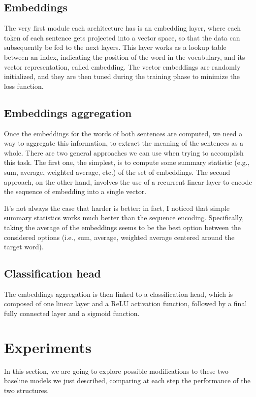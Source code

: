 \documentclass[11pt,a4paper]{article}
\begin{document}
	
	\subsection{Embeddings}
	The very first module each architecture has is an embedding layer, where each token of each sentence gets projected into a vector space, so that the data can subsequently be fed to the next layers. This layer works as a lookup table between an index, indicating the position of the word in the vocabulary, and its vector representation, called embedding. The vector embeddings are randomly initialized, and they are then tuned during the training phase to minimize the loss function.
	
	\subsection{Embeddings aggregation}
	Once the embeddings for the words of both sentences are computed, we need a way to aggregate this information, to extract the meaning of the sentences as a whole. There are two general approaches we can use when trying to accomplish this task. The first one, the simplest, is to compute some summary statistic (e.g., sum, average, weighted average, etc.) of the set of embeddings. The second approach, on the other hand, involves the use of a recurrent linear layer to encode the sequence of embedding into a single vector.
	
	It's not always the case that harder is better: in fact, I noticed that simple summary statistics works much better than the sequence encoding. Specifically, taking the average of the embeddings seems to be the best option between the considered options (i.e., sum, average, weighted average centered around the target word).
	
	\subsection{Classification head}
	The embeddings aggregation is then linked to a classification head, which is composed of one linear layer and a ReLU activation function, followed by a final fully connected layer and a sigmoid function.

	\section{Experiments}
	In this section, we are going to explore possible modifications to these two baseline models we just described, comparing at each step the performance of the two structures.
	
\end{document}
